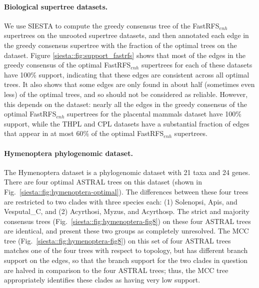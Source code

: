 \paragraph{Biological supertree datasets. }
We use SIESTA to compute the greedy consensus tree of the FastRFS$_{enh}$ supertrees on the unrooted supertree datasets, and then annotated each edge in the greedy consensus supertree with the fraction of the optimal trees  on the dataset.
Figure \ref{siesta::fig:support_fastrfs} shows that most of the edges in the greedy consensus of the optimal FastRFS$_{enh}$ supertrees for each of these datasets have 100\% support, indicating that these edges are consistent across all optimal trees.
It also shows that some  edges are only found in about half (sometimes even less) of the optimal trees, and so should not be considered as reliable.
However, this depends on the dataset:  nearly all the edges in the greedy consensus of the optimal FastRFS$_{enh}$ supertrees for the placental mammals dataset have 100\% support, while the THPL and CPL datasets have a substantial fraction of edges that appear in at most 60\% of the optimal FastRFS$_{enh}$ supertrees.

  
\paragraph{Hymenoptera phylogenomic dataset. }

The Hymenoptera dataset is a phylogenomic dataset with 21 taxa and 24 genes.
There are four optimal ASTRAL trees on this dataset (shown in Fig.~\ref{siesta::fig:hymenoptera-optimal}). 
The differences between these four trees are restricted to two clades with three species each: (1) Solenopsi, Apis, and Vesputal\_C, and (2) Acyrthosi, Myzus, and Acyrthosp. 
The strict and majority consensus trees (Fig.~\ref{siesta::fig:hymenoptera-fig8}) on these four ASTRAL trees are identical, and present these two groups as completely unresolved.
The MCC tree (Fig.~\ref{siesta::fig:hymenoptera-fig8}) on this set of four ASTRAL trees matches one of the four trees with respect to topology, but has different branch support on the edges, so that the branch support for the two clades in question are halved in comparison to the four ASTRAL trees; thus, the MCC tree appropriately identifies these clades as having very low support.


